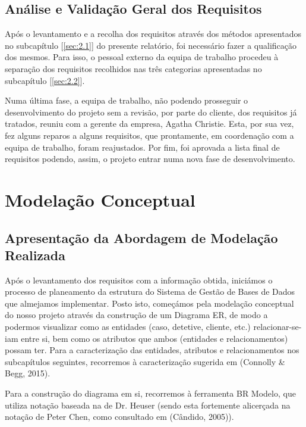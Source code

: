 \documentclass[a4paper,12pt]{scrreprt}
\begin{document}
    \section{Análise e Validação Geral dos Requisitos}
        
        Após o levantamento e a recolha dos requisitos através dos métodos apresentados no subcapítulo [\ref{sec:2.1}] do presente relatório, foi necessário fazer a qualificação dos mesmos. Para isso, o pessoal externo da equipa de trabalho procedeu à separação dos requisitos recolhidos nas três categorias apresentadas no subcapítulo [\ref{sec:2.2}].
        
        Numa última fase, a equipa de trabalho, não podendo prosseguir o desenvolvimento do projeto sem a revisão, por parte do cliente, dos requisitos já tratados, reuniu com a gerente da empresa, Agatha Christie. Esta, por sua vez, fez alguns reparos a alguns requisitos, que prontamente, em coordenação com a equipa de trabalho, foram reajustados. Por fim, foi aprovada a lista final de requisitos podendo, assim, o projeto entrar numa nova fase de desenvolvimento.



\chapter{Modelação Conceptual}
    \section{Apresentação da Abordagem de Modelação Realizada}
        {
            Após o levantamento dos requisitos com a informação obtida, iniciámos o processo de planeamento da estrutura do Sistema de Gestão de Bases de Dados que almejamos implementar.
            Posto isto, começámos pela modelação conceptual do nosso projeto através da construção de um Diagrama ER, de modo a podermos visualizar como as entidades (caso, detetive, cliente, etc.) relacionar-se-iam entre si, bem como os atributos que ambos (entidades e relacionamentos) possam ter. Para a caracterização das entidades, atributos e relacionamentos nos subcapítulos seguintes, recorremos à caracterização sugerida em  \cite{DatabaseSystems} (Connolly \& Begg, 2015).

            Para a construção do diagrama em si, recorremos à ferramenta BR Modelo, que utiliza notação baseada na de Dr$.$ Heuser (sendo esta fortemente alicerçada na notação de Peter Chen, como consultado em \cite{Aprendizagem em Banco de Dados} (Cândido, 2005)).
        }
\end{document}
